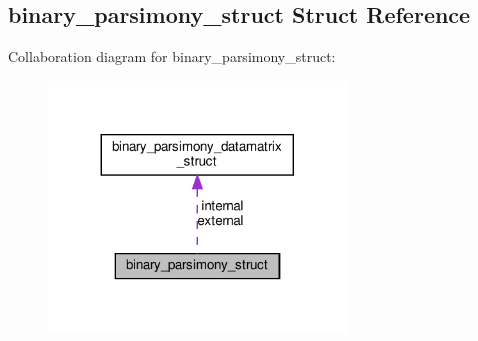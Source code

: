 \hypertarget{structbinary__parsimony__struct}{}\subsection{binary\+\_\+parsimony\+\_\+struct Struct Reference}
\label{structbinary__parsimony__struct}


Collaboration diagram for binary\+\_\+parsimony\+\_\+struct\+:\nopagebreak
\begin{figure}[H]
\begin{center}
\leavevmode
\includegraphics[width=224pt]{structbinary__parsimony__struct__coll__graph}
\end{center}
\end{figure}
